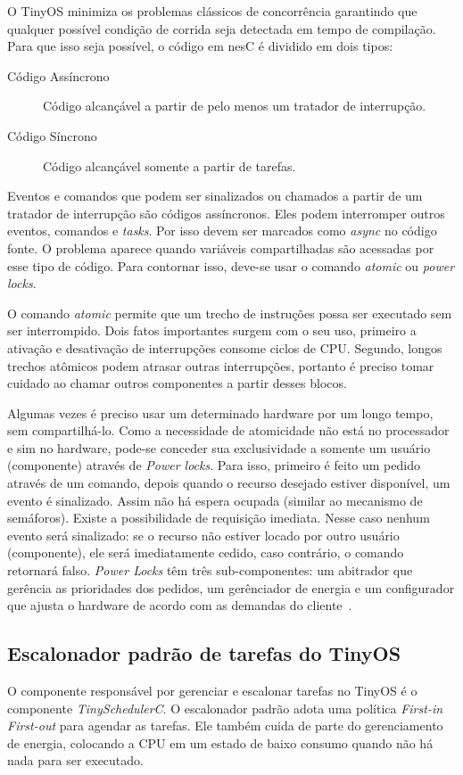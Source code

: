 \documentclass[a4paper,onecolumn, 10pt]{article}
\begin{document}
O TinyOS minimiza os problemas clássicos de concorrência garantindo que qualquer possível condição de
corrida seja detectada em tempo de compilação. Para que isso seja possível, o código em nesC é dividido em dois tipos:
\begin{description}
    \item[Código Assíncrono] Código alcançável a partir de pelo menos um tratador de interrupção.
    \item[Código Síncrono] Código alcançável somente a partir de tarefas.
\end{description}

Eventos e comandos que podem ser sinalizados ou chamados a partir de um tratador de interrupção são códigos assíncronos.
Eles podem interromper outros eventos, comandos e \textit{tasks}. Por isso devem ser marcados como \textit{async} no
código fonte. O problema aparece quando variáveis compartilhadas são acessadas por esse tipo de código. Para contornar
isso, deve-se usar o comando \textit{atomic} ou \textit{power locks}.

O comando \textit{atomic} permite que um trecho de instruções possa ser executado sem ser interrompido. Dois fatos
importantes surgem com o seu uso, primeiro a ativação e desativação de interrupções consome ciclos de CPU. Segundo,
longos trechos atômicos podem atrasar outras interrupções, portanto é preciso tomar cuidado ao chamar outros componentes
a partir desses blocos.

Algumas vezes é preciso usar um determinado hardware por um longo tempo, sem compartilhá-lo. 
Como a necessidade de atomicidade não está no processador e sim no hardware, 
pode-se conceder sua exclusividade a somente um usuário (componente) através de
\textit{Power locks}. Para isso, primeiro é feito um pedido através de um comando, depois quando o recurso desejado
estiver disponível, um evento é sinalizado. Assim não há espera ocupada (similar ao mecanismo de semáforos). 
Existe a possibilidade de requisição imediata. 
Nesse caso nenhum evento será sinalizado: se o recurso não estiver locado por outro usuário (componente), ele será
imediatamente cedido, caso contrário, o comando retornará falso. \textit{Power Locks} têm três sub-componentes: um
abitrador que gerência as prioridades dos pedidos, um gerênciador de energia e um configurador que ajusta o hardware de
acordo com as demandas do cliente~\cite[Cap.11]{LevisGay/09}.

\subsection{Escalonador padrão de tarefas do TinyOS}\label{escalonadorpadrao}
O componente responsável por gerenciar e escalonar tarefas no TinyOS é o componente {\em TinySchedulerC}.
O escalonador padrão adota uma política {\em First-in First-out} para agendar as tarefas. Ele também
cuida de parte do gerenciamento de energia, colocando a CPU em um estado de baixo consumo quando
não há nada para ser executado.
\end{document}
